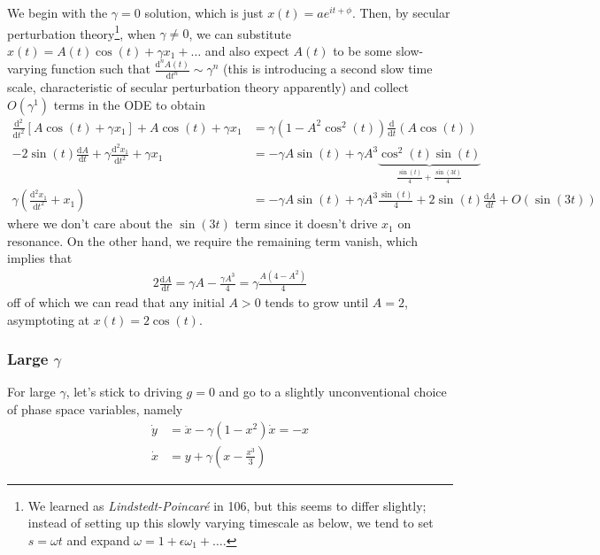 \documentclass[10pt]{article}
\newcommand{\rd}[2]{\frac{\mathrm{d}#1}{\mathrm{d}#2}}
\newcommand{\rtd}[2]{\frac{\mathrm{d}^2#1}{\mathrm{d}#2^2}}
\begin{document}
We begin with the $\gamma=0$ solution, which is just $x(t) = ae^{it + \phi}$.
Then, by secular perturbation theory\footnote{We learned as
\emph{Lindstedt-Poincar\'e} in 106, but this seems to differ slightly; instead
of setting up this slowly varying timescale as below, we tend to set $s = \omega
t$ and expand $\omega = 1 + \epsilon \omega_1 +\dots$.}, when $\gamma \neq 0$,
we can substitute $x(t) = A(t)\cos(t) + \gamma x_1 +\dots$ and also expect
$A(t)$ to be some slow-varying function such that
$\frac{\mathrm{d}^nA(t)}{\mathrm{d}t^n} \sim \gamma^n$ (this is introducing a
second slow time scale, characteristic of secular perturbation theory
apparently) and collect $O(\gamma^1)$ terms in the ODE to obtain
\begin{align}
    \rtd{}{t}\left[ A\cos(t) + \gamma x_1 \right] + A\cos(t) + \gamma x_1 &=
    \gamma(1 - A^2\cos^2(t))\rd{}{t}(A\cos(t)) \nonumber\\
    - 2\sin(t)\rd{A}{t} + \gamma\rtd{x_1}{t} + \gamma x_1 &= -\gamma A\sin(t) +
    \gamma A^3\underbrace{\cos^2(t)\sin(t)}_{\frac{\sin(t)}{4} +
    \frac{\sin(3t)}{4}} \nonumber\\
    \gamma\left(\rtd{x_1}{t} + x_1\right) &= -\gamma A\sin(t) + \gamma
    A^3\frac{\sin(t)}{4} + 2\sin(t)\rd{A}{t} + O(\sin(3t))
\end{align}
where we don't care about the $\sin(3t)$ term since it doesn't drive $x_1$ on
resonance. On the other hand, we require the remaining term vanish, which
implies that
\begin{align}
    2\rd{A}{t} = \gamma A - \frac{\gamma A^3}{4} = \gamma \frac{A(4 - A^2)}{4}
\end{align}
off of which we can read that any initial $A > 0$ tends to grow until $A = 2$,
asymptoting at $x(t) = 2\cos(t)$.

\subsubsection{Large $\gamma$}

For large $\gamma$, let's stick to driving $g=0$ and go to a slightly
unconventional choice of phase space variables, namely
\begin{align}
    \dot{y} &= \ddot{x} - \gamma(1-x^2)\dot{x} = -x\\
    \dot{x} &= y + \gamma\left( x - \frac{x^3}{3} \right)
\end{align}
\end{document}
